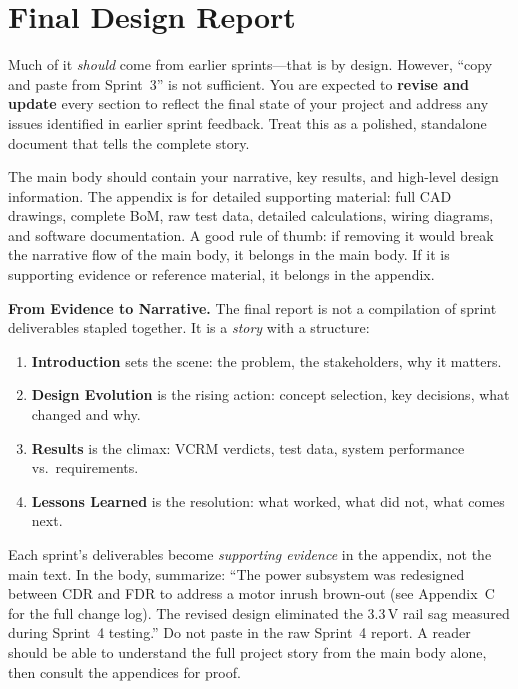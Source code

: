 \section{Final Design Report}

\begin{faqbox}
Much of it \textit{should} come from earlier sprints---that is by design. However, ``copy and paste from Sprint~3'' is not sufficient. You are expected to \textbf{revise and update} every section to reflect the final state of your project and address any issues identified in earlier sprint feedback. Treat this as a polished, standalone document that tells the complete story.
\end{faqbox}

\begin{faqbox}
The main body should contain your narrative, key results, and high-level design information. The appendix is for detailed supporting material: full CAD drawings, complete BoM, raw test data, detailed calculations, wiring diagrams, and software documentation. A good rule of thumb: if removing it would break the narrative flow of the main body, it belongs in the main body. If it is supporting evidence or reference material, it belongs in the appendix.
\end{faqbox}

\begin{protip}
\textbf{From Evidence to Narrative.} The final report is not a compilation of sprint deliverables stapled together. It is a \textit{story} with a structure:

\begin{enumerate}[leftmargin=*, itemsep=1pt, topsep=0pt]
    \item \textbf{Introduction} sets the scene: the problem, the stakeholders, why it matters.
    \item \textbf{Design Evolution} is the rising action: concept selection, key decisions, what changed and why.
    \item \textbf{Results} is the climax: VCRM verdicts, test data, system performance vs.\ requirements.
    \item \textbf{Lessons Learned} is the resolution: what worked, what did not, what comes next.
\end{enumerate}

Each sprint's deliverables become \textit{supporting evidence} in the appendix, not the main text. In the body, summarize: ``The power subsystem was redesigned between CDR and FDR to address a motor inrush brown-out (see Appendix~C for the full change log). The revised design eliminated the 3.3\,V rail sag measured during Sprint~4 testing.'' Do not paste in the raw Sprint~4 report. A reader should be able to understand the full project story from the main body alone, then consult the appendices for proof.
\end{protip}

